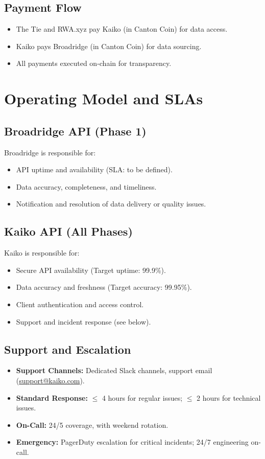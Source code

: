 \documentclass[12pt,a4paper]{article}
\begin{document}
\subsection*{Payment Flow}
\begin{itemize}[leftmargin=*]
    \item The Tie and RWA.xyz pay Kaiko (in Canton Coin) for data access.
    \item Kaiko pays Broadridge (in Canton Coin) for data sourcing.
    \item All payments executed on-chain for transparency.
\end{itemize}

\section{Operating Model and SLAs}

\subsection*{Broadridge API (Phase 1)}
Broadridge is responsible for:
\begin{itemize}[leftmargin=*]
    \item API uptime and availability (SLA: to be defined).
    \item Data accuracy, completeness, and timeliness.
    \item Notification and resolution of data delivery or quality issues.
\end{itemize}

\subsection*{Kaiko API (All Phases)}
Kaiko is responsible for:
\begin{itemize}[leftmargin=*]
    \item Secure API availability (Target uptime: 99.9\%).
    \item Data accuracy and freshness (Target accuracy: 99.95\%).
    \item Client authentication and access control.
    \item Support and incident response (see below).
\end{itemize}

\subsection*{Support and Escalation}
\begin{itemize}[leftmargin=*]
    \item \textbf{Support Channels:} Dedicated Slack channels, support email (\href{mailto:support@kaiko.com}{support@kaiko.com}).
    \item \textbf{Standard Response:} $\leq$ 4 hours for regular issues; $\leq$ 2 hours for technical issues.
    \item \textbf{On-Call:} 24/5 coverage, with weekend rotation.
    \item \textbf{Emergency:} PagerDuty escalation for critical incidents; 24/7 engineering on-call.
\end{itemize}
\end{document}
